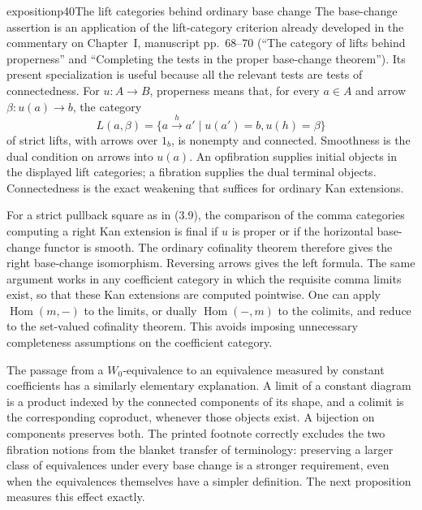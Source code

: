 \begin{dcomment}{exposition}{p40}{The lift categories behind ordinary base change}
The base-change assertion is an application of the lift-category criterion already developed in the commentary on Chapter~I, manuscript pp.~68--70 (``The category of lifts behind properness'' and ``Completing the tests in the proper base-change theorem''). Its present specialization is useful because all the relevant tests are tests of connectedness. For $u:A\longrightarrow B$, properness means that, for every $a\in A$ and arrow $\beta:u(a)\longrightarrow b$, the category
\[
 L(a,\beta)=\{a\xrightarrow{h}a'\mid u(a')=b, u(h)=\beta\}
\]
of strict lifts, with arrows over $1_b$, is nonempty and connected. Smoothness is the dual condition on arrows into $u(a)$. An opfibration supplies initial objects in the displayed lift categories; a fibration supplies the dual terminal objects. Connectedness is the exact weakening that suffices for ordinary Kan extensions.

For a strict pullback square as in (3.9), the comparison of the comma categories computing a right Kan extension is final if $u$ is proper or if the horizontal base-change functor is smooth. The ordinary cofinality theorem therefore gives the right base-change isomorphism. Reversing arrows gives the left formula. The same argument works in any coefficient category in which the requisite comma limits exist, so that these Kan extensions are computed pointwise. One can apply $\operatorname{Hom}(m,-)$ to the limits, or dually $\operatorname{Hom}(-,m)$ to the colimits, and reduce to the set-valued cofinality theorem. This avoids imposing unnecessary completeness assumptions on the coefficient category.

The passage from a $W_0$-equivalence to an equivalence measured by constant coefficients has a similarly elementary explanation. A limit of a constant diagram is a product indexed by the connected components of its shape, and a colimit is the corresponding coproduct, whenever those objects exist. A bijection on components preserves both. The printed footnote correctly excludes the two fibration notions from the blanket transfer of terminology: preserving a larger class of equivalences under every base change is a stronger requirement, even when the equivalences themselves have a simpler definition. The next proposition measures this effect exactly.
\end{dcomment}

